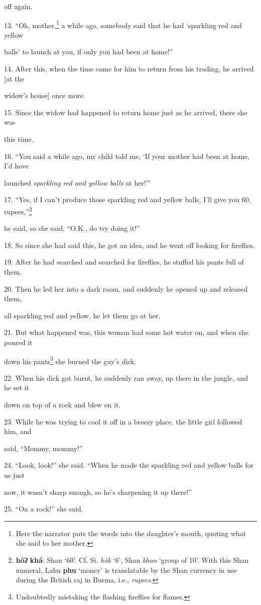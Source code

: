 off again.

13. ``Oh, mother,\footnote{Here the narrator puts the words into the daughter's mouth, quoting what she said to her mother.} a while ago, somebody said that he had `sparkling red and
yellow

balls' to launch at you, if only you had been at home!''

14. After this, when the time came for him to return from his trading, he arrived
[at the

widow's house] once more.

15. Since the widow had happened to return home just as he arrived, there she was


this time.

16. ``You said a while ago, my child told me, `If your mother had been at home,
I'd have

launched \textit{sparkling red and yellow balls} at her!'"

17. ``Yes, if I can't produce those sparkling red and yellow balls, I'll give you
60. rupees,''\footnote{\textbf{hôʔ} \textbf{khá}: Shan `60'. Cf. Si. \textit{hòk} `6', Shan \textit{khan} `group of 10'. With this Shan numeral, Lahu \textbf{phu} `money' is translatable by the Shan currency in use during the British raj in Burma, i.e., \textit{rupees}.}

he said, so she said, ``O.K., do try doing it!''

18. So since she had said this, he got an idea, and he went off looking for fireflies.

19. After he had searched and searched for fireflies, he stuffed his pants full
of them.

20. Then he led her into a dark room, and suddenly he opened up and released them,


all sparkling red and yellow, he let them go at her.

21. But what happened was, this woman had some hot water on, and when she poured
it

down his pants\footnote{Undoubtedly mistaking the flashing fireflies for flames.} she burned the guy's dick.

22. When his dick got burnt, he suddenly ran away, up there in the jungle, and
he set it

down on top of a rock and blew on it.

23. While he was trying to cool it off in a breezy place, the little girl followed
him, and

said, ``Mommy, mommy!''

24. ``Look, look!'' she said. ``When he made the sparkling red and yellow balls
for us just

now, it wasn't sharp enough, so he's sharpening it up there!''

25. ``On a rock!'' she said.

